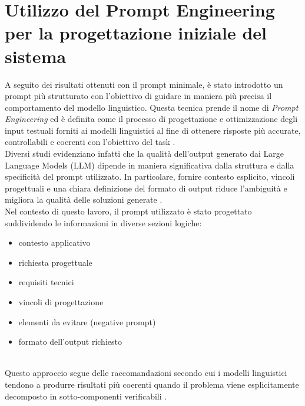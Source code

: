 \section{Utilizzo del Prompt Engineering per la progettazione iniziale del sistema}

A seguito dei risultati ottenuti con il prompt minimale, è stato introdotto un prompt più strutturato con l'obiettivo di guidare in maniera più precisa il comportamento del modello linguistico. Questa tecnica prende il nome di \textit{Prompt Engineering} ed è definita come il processo di progettazione e ottimizzazione degli input testuali forniti ai modelli linguistici al fine di ottenere risposte più accurate, controllabili e coerenti con l'obiettivo del task \cite{Sahoo2024PromptSurvey}.
\\
Diversi studi evidenziano infatti che la qualità dell'output generato dai Large Language Models (LLM) dipende in maniera significativa dalla struttura e dalla specificità del prompt utilizzato. In particolare, fornire contesto esplicito, vincoli progettuali e una chiara definizione del formato di output riduce l'ambiguità e migliora la qualità delle soluzioni generate \cite{White2023PromptPatterns}.
\\
Nel contesto di questo lavoro, il prompt utilizzato è stato progettato suddividendo le informazioni in diverse sezioni logiche:

\begin{itemize}definizione del task
\item contesto applicativo
\item richiesta progettuale
\item requisiti tecnici
\item vincoli di progettazione
\item elementi da evitare (negative prompt)
\item formato dell'output richiesto
\end{itemize}
\\
Questo approccio segue delle raccomandazioni secondo cui i modelli linguistici tendono a produrre risultati più coerenti quando il problema viene esplicitamente decomposto in sotto-componenti verificabili \cite{Midolo2026CodeGuidelines}.
\\
